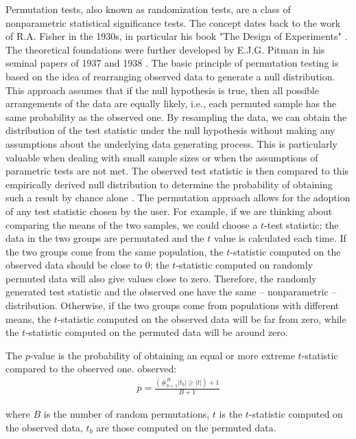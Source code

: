 \documentclass[twocolumn]{article}\usepackage[]{graphicx}\usepackage[]{xcolor}
\begin{document}
Permutation tests, also known as randomization tests, are a class of nonparametric statistical significance tests. The concept dates back to the work of R.A. Fisher in the 1930s, in particular his book "The Design of Experiments" \cite{fisher:1935}. The theoretical foundations were further developed by E.J.G. Pitman in his seminal papers of 1937 \cite{pitman1937significance} and 1938 \cite{pitman1938significance}. The basic principle of permutation testing is based on the idea of rearranging observed data to generate a null distribution. This approach assumes that if the null hypothesis is true, then all possible arrangements of the data are equally likely, i.e., each permuted sample has the same probability as the observed one. By resampling the data, we can obtain the distribution of the test statistic under the null hypothesis without making any assumptions about the underlying data generating process. This is particularly valuable when dealing with small sample sizes or when the assumptions of parametric tests are not met. The observed test statistic is then compared to this empirically derived null distribution to determine the probability of obtaining such a result by chance alone \cite{pesarin2001}.
The permutation approach allows for the adoption of any test statistic chosen by the user.
For example, if we are thinking about comparing the means of the two samples, we could choose a $t$-test statistic; the data in the two groups are permutated and the $t$ value is calculated each time. If the two groups come from the same population, the $t$-statistic computed on the observed data should be close to 0; the $t$-statistic computed on randomly permuted data will also give values close to zero. Therefore, the randomly generated test statistic and the observed one have the same -- nonparametric -- distribution.  Otherwise, if
the two groups come from populations with different means, the $t$-statistic computed on the observed data will be far from zero, while the $t$-statistic computed on the permuted data will be around zero.

The $p$-value is the probability of obtaining an equal or more extreme $t$-statistic compared to the observed one.
observed:
\begin{eqnarray}
p=\frac{(\#_{b=1}^B |t_b|\geq |t|)+1}{B+1}
\end{eqnarray}

where $B$ is the number of random permutations, $t$ is the $t$-statistic computed on the observed data, $t_b$ are those computed on the permuted data.
\end{document}
